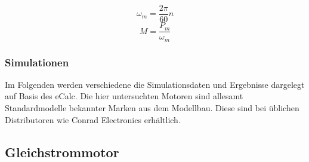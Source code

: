 \[ \omega_m = \frac{2\pi}{60} n \]
\[ M = \frac{P_m}{\omega_m} \]

\subsubsection{Simulationen}
Im Folgenden werden verschiedene die Simulationsdaten und Ergebnisse
dargelegt auf Basis des eCalc. Die hier untersuchten Motoren sind
allesamt Standardmodelle bekannter Marken aus dem Modellbau. Diese
sind bei üblichen Distributoren wie Conrad Electronics erhältlich.

\newpage


\newpage


\newpage


\newpage

\newpage

\subsection{Gleichstrommotor}

